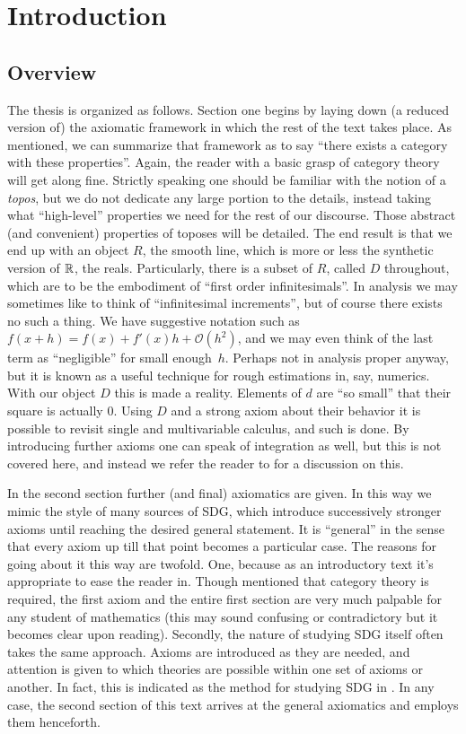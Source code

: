 \chapter*{Introduction}

\section*{Overview}

The thesis is organized as follows. Section one begins by laying down (a reduced version of) the axiomatic framework in which the rest of the text takes place. As mentioned, we can summarize that framework as to say ``there exists a category with these properties''. Again, the reader with a basic grasp of category theory will get along fine. Strictly speaking one should be familiar with the notion of a \emph{topos}, but we do not dedicate any large portion to the details, instead taking what ``high-level'' properties we need for the rest of our discourse. Those abstract (and convenient) properties of toposes will be detailed. The end result is that we end up with an object \( R \), the smooth line, which is more or less the synthetic version of \( \mathbb{R} \), the reals. Particularly, there is a subset of \( R \), called \( D \) throughout, which are to be the embodiment of ``first order infinitesimals''. In analysis we may sometimes like to think of ``infinitesimal increments'', but of course there exists no such a thing. We have suggestive notation such as \( f(x+h) = f(x) + f'(x)h + \mathcal O(h^2) \), and we may even think of the last term as ``negligible'' for small enough~\( h \). Perhaps not in analysis proper anyway, but it is known as a useful technique for rough estimations in, say, numerics. With our object \( D \) this is made a reality. Elements of \( d \) are ``so small'' that their square is actually \( 0 \). Using \( D \) and a strong axiom about their behavior it is possible to revisit single and multivariable calculus, and such is done. By introducing further axioms one can speak of integration as well, but this is not covered here, and instead we refer the reader to \cite{lav96} for a discussion on this.

In the second section further (and final) axiomatics are given. In this way we mimic the style of many sources of SDG, which introduce successively stronger axioms until reaching the desired general statement. It is ``general'' in the sense that every axiom up till that point becomes a particular case. The reasons for going about it this way are twofold. One, because as an introductory text it's appropriate to ease the reader in. Though mentioned that category theory is required, the first axiom and the entire first section are very much palpable for any student of mathematics (this may sound confusing or contradictory but it becomes clear upon reading). Secondly, the nature of studying SDG itself often takes the same approach. Axioms are introduced as they are needed, and attention is given to which theories are possible within one set of axioms or another. In fact, this is indicated as the method for studying SDG in \cite{bun17}. In any case, the second section of this text arrives at the general axiomatics and employs them henceforth.

